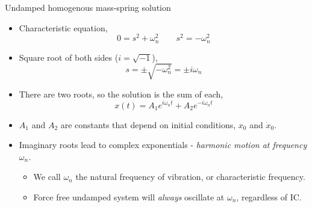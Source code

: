 \documentclass[11pt,aspectratio=169,handout]{beamer}
\begin{document}
\begin{frame}[c]{Undamped homogenous mass-spring solution}
			\begin{itemize}
				\item<1-> Characteristic equation,
				\begin{equation}\label{}
					0 = s^2 + \omega_n^2  \quad\quad s^2 = -\omega_n^2
				\end{equation}
			\item<2-> Square root of both sides ($i = \sqrt{-1}$), 
			\begin{equation}
				s = \pm \sqrt{-\omega_n^2} = \pm i \omega _n
			\end{equation}
			\item<3-> There are two roots, so the solution is the sum of each,
			\begin{equation}
			x(t) = A_1 e^{i\omega_n t} + A_2 e^{-i\omega_n t}
			\end{equation}
			\item<4-> $A_1$ and $A_2$ are constants that depend on initial conditions, $x_0$ and $\dot{x}_0$.
			\item<4-> Imaginary roots lead to complex exponentials - \textit{harmonic motion at frequency $\omega_n$.}
			\begin{itemize}
				\item[-] We call $\omega_n$ the natural frequency of vibration, or characteristic frequency. 
				\item[-] Force free undamped system will \textit{always} oscillate at $\omega_n$, regardless of IC.
			\end{itemize}
			\end{itemize}
\end{frame}
\end{document}
